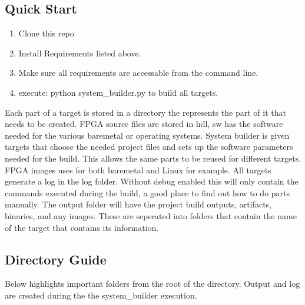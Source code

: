 \subsection{Quick Start}
\begin{enumerate}
\item Clone this repo
\item Install Requirements listed above.
\item Make sure all requirements are accessable from the command line.
\item execute: python system\_builder.py to build all targets.
\end{enumerate}

\par
Each part of a target is stored in a directory the represents the part of it that needs to be created. FPGA source files are stored in hdl, sw has the software needed
for the various baremetal or operating systems. System builder is given targets that choose the needed project files and sets up the software parameters needed for the build.
This allows the same parts to be reused for different targets. FPGA images uses for both baremetal and Linux for example. All targets generate a log in the log folder.
Without debug enabled this will only contain the commands executed during the build, a good place to find out how to do parts manually. The output folder will have
the project build outputs, artifacts, binaries, and any images. These are seperated into folders that contain the name of the target that contains its information.

\subsection{Directory Guide}

\par
Below highlights important folders from the root of the directory. Output and log are created during the the system\_builder execution.

